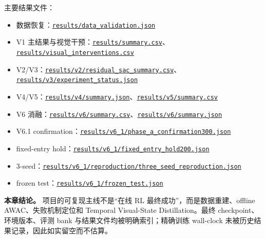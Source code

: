 主要结果文件：

\begin{itemize}
\tightlist
\item
  数据恢复：\href{../results/data_validation.json}{\texttt{results/data\_validation.json}}
\item
  V1 主结果与视觉干预：\href{../results/summary.csv}{\texttt{results/summary.csv}}、\href{../results/visual_interventions.csv}{\texttt{results/visual\_interventions.csv}}
\item
  V2/V3：\href{../results/v2/residual_sac_summary.csv}{\nolinkurl{results/v2/residual_sac_summary.csv}}、\href{../results/v3/experiment_status.json}{\texttt{results/v3/experiment\_status.json}}
\item
  V4/V5：\href{../results/v4/summary.json}{\texttt{results/v4/summary.json}}、\href{../results/v5/summary.csv}{\texttt{results/v5/summary.csv}}
\item
  V6 消融：\href{../results/v6/summary.csv}{\texttt{results/v6/summary.csv}}、\href{../results/v6/summary.json}{\texttt{results/v6/summary.json}}
\item
  V6.1 confirmation：\href{../results/v6_1/phase_a_confirmation300.json}{\nolinkurl{results/v6_1/phase_a_confirmation300.json}}
\item
  fixed-entry hold：\href{../results/v6_1/fixed_entry_hold200.json}{\nolinkurl{results/v6_1/fixed_entry_hold200.json}}
\item
  3-seed：\href{../results/v6_1/reproduction/three_seed_reproduction.json}{\nolinkurl{results/v6_1/reproduction/three_seed_reproduction.json}}
\item
  frozen test：\href{../results/v6_1/frozen_test.json}{\texttt{results/v6\_1/frozen\_test.json}}
\end{itemize}

\textbf{本章结论。} 项目的可复现主线不是``在线 RL 最终成功''，而是数据重建、offline AWAC、失败机制定位和 Temporal Visual-State Distillation。最终 checkpoint、环境版本、评测 bank 与结果文件均被明确索引；精确训练 wall-clock 未被历史结果记录，因此如实留空而不估算。
